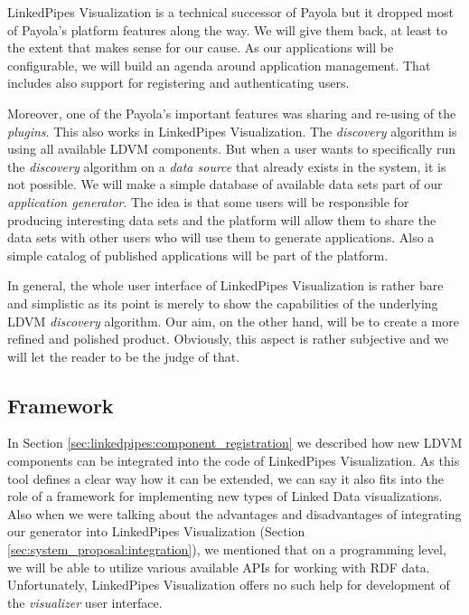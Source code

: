 LinkedPipes Visualization is a technical successor of Payola but it dropped most of Payola's platform features along the way. We will give them back, at least to the extent that makes sense for our cause. As our applications will be configurable, we will build an agenda around application management. That includes also support for registering and authenticating users.

Moreover, one of the Payola's important features was sharing and re-using of the \emph{plugins}. This also works in LinkedPipes Visualization. The \emph{discovery} algorithm is using all available LDVM components. But when a user wants to specifically run the \emph{discovery} algorithm on a \emph{data source} that already exists in the system, it is not possible. We will make a simple database of available data sets part of our \emph{application generator}. The idea is that some users will be responsible for producing interesting data sets and the platform will allow them to share the data sets with other users who will use them to generate applications. Also a simple catalog of published applications will be part of the platform.

In general, the whole user interface of LinkedPipes Visualization is rather bare and simplistic as its point is merely to show the capabilities of the underlying LDVM \emph{discovery} algorithm. Our aim, on the other hand, will be to create a more refined and polished product. Obviously, this aspect is rather subjective and we will let the reader to be the judge of that.

\subsection{Framework}

In Section \ref{sec:linkedpipes:component_registration} we described how new LDVM components  can be integrated into the code of LinkedPipes Visualization. As this tool defines a clear way how it can be extended, we can say it also fits into the role of a framework for implementing new types of Linked Data visualizations. Also when we were talking about the advantages and disadvantages of integrating our generator into LinkedPipes Visualization (Section \ref{sec:system_proposal:integration}), we mentioned that on a programming level, we will be able to utilize various available APIs for working with RDF data. Unfortunately, LinkedPipes Visualization offers no such help for development of the \emph{visualizer} user interface.

